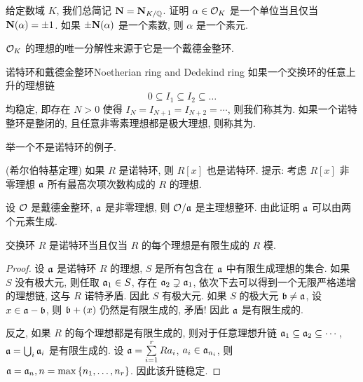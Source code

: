 \begin{exercise}
	给定数域 $K$, 我们总简记 ${\mathbf{N}}={\mathbf{N}}_{K/{\mathbb{Q}}}$.
	证明 $\alpha\in {\mathcal{O}}_K$ 是一个单位当且仅当 ${\mathbf{N}}(\alpha)=\pm 1$.
	如果 $\pm{\mathbf{N}}(\alpha)$ 是一个素数, 则 $\alpha$ 是一个素元.
\end{exercise}
	
${\mathcal{O}}_K$ 的理想的唯一分解性来源于它是一个戴德金整环.

\begin{definition}{诺特环和戴德金整环}{Noetherian ring and Dedekind ring}
	如果一个交换环的任意上升的理想链
	\[0\subseteq I_1\subseteq I_2\subseteq \dots \]
	均稳定, 即存在 $N>0$ 使得 $I_N=I_{N+1}=I_{N+2}=\cdots$, 则我们称其为.
	如果一个诺特整环是整闭的, 且任意非零素理想都是极大理想, 则称其为.
\end{definition}

\begin{exercise}
	举一个不是诺特环的例子.
\end{exercise}

\begin{exercise}
	(希尔伯特基定理) 如果 $R$ 是诺特环, 则 $R[x]$ 也是诺特环. 提示: 考虑 $R[x]$ 非零理想 ${\mathfrak{a}}$ 所有最高次项次数构成的 $R$ 的理想.
\end{exercise}

\begin{exercise}
	设 ${\mathcal{O}}$ 是戴德金整环, ${\mathfrak{a}}$ 是非零理想, 则 ${\mathcal{O}}/{\mathfrak{a}}$ 是主理想整环. 由此证明 ${\mathfrak{a}}$ 可以由两个元素生成.
\end{exercise}

\begin{proposition}{}{}
	交换环 $R$ 是诺特环当且仅当 $R$ 的每个理想是有限生成的 $R$ 模.
\end{proposition}

\begin{proof}
	设 ${\mathfrak{a}}$ 是诺特环 $R$ 的理想, $S$ 是所有包含在 ${\mathfrak{a}}$ 中有限生成理想的集合.
	如果 $S$ 没有极大元, 则任取 ${\mathfrak{a}}_1\in S$, 存在 ${\mathfrak{a}}_2\supsetneq {\mathfrak{a}}_1$, 依次下去可以得到一个无限严格递增的理想链, 这与 $R$ 诺特矛盾.
	因此 $S$ 有极大元.
	如果 $S$ 的极大元 ${\mathfrak{b}}\neq {\mathfrak{a}}$, 设 $x\in{\mathfrak{a}}-{\mathfrak{b}}$, 则 ${\mathfrak{b}}+(x)$ 仍然是有限生成的, 矛盾!
	因此 ${\mathfrak{a}}$ 是有限生成的.
	
	反之, 如果 $R$ 的每个理想都是有限生成的, 则对于任意理想升链 ${\mathfrak{a}}_1\subseteq {\mathfrak{a}}_2\subseteq \cdots$, ${\mathfrak{a}}=\bigcup_i{\mathfrak{a}}_i$ 是有限生成的.
	设 ${\mathfrak{a}}=\sum\limits_{i=1}^r Ra_i$, $a_i\in {\mathfrak{a}}_{n_i}$, 则 ${\mathfrak{a}}={\mathfrak{a}}_n,n=\max\left\{n_1,\dots,n_r\right\}$.
	因此该升链稳定.
\end{proof}

